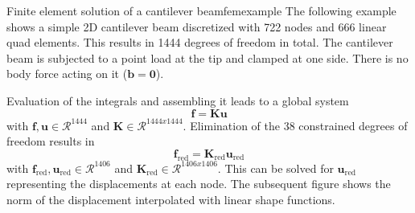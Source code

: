 \begin{example}{Finite element solution of a cantilever beam}{femexample} 
    The following example shows a simple 2D cantilever beam discretized with 722 nodes and 666 linear quad elements. This results in 1444 degrees of freedom in total. The cantilever beam is subjected to a point load at the tip and clamped at one side. There is no body force acting on it ($\mathbf{b} = \mathbf{0}$).
    \begin{center}
        
    \end{center}
    Evaluation of the integrals and assembling it leads to a global system 
    \begin{equation}
        \mathbf{f} = \mathbf{K} \mathbf{u}
    \end{equation}
    with $\mathbf{f}, \mathbf{u} \in \mathcal{R}^{1444}$ and $\mathbf{K} \in \mathcal{R}^{1444x1444}$. Elimination of the 38 constrained degrees of freedom results in 
    \begin{equation}
        \mathbf{f}_\textrm{red} = \mathbf{K}_\textrm{red} \mathbf{u}_\textrm{red}
    \end{equation}
    with $\mathbf{f}_\textrm{red}, \mathbf{u}_\textrm{red} \in \mathcal{R}^{1406}$ and $\mathbf{K}_\textrm{red} \in \mathcal{R}^{1406x1406}$. This can be solved for $\mathbf{u}_\textrm{red}$ representing the displacements at each node. The subsequent figure shows the norm of the displacement interpolated with linear shape functions.
    \begin{center}
        
    \end{center}
\end{example}


 



